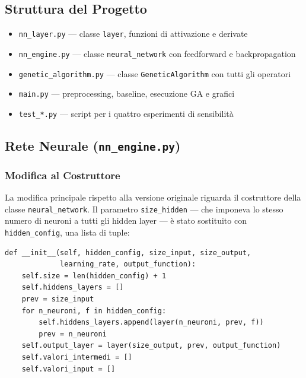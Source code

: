 \documentclass[12pt, a4paper]{article}
\begin{document}
\subsection{Struttura del Progetto}

\begin{itemize}
    \item \texttt{nn\_layer.py} --- classe \texttt{layer}, funzioni di attivazione e derivate
    \item \texttt{nn\_engine.py} --- classe \texttt{neural\_network} con feedforward e backpropagation
    \item \texttt{genetic\_algorithm.py} --- classe \texttt{GeneticAlgorithm} con tutti gli operatori
    \item \texttt{main.py} --- preprocessing, baseline, esecuzione GA e grafici
    \item \texttt{test\_*.py} --- script per i quattro esperimenti di sensibilità
\end{itemize}

\subsection{Rete Neurale (\texttt{nn\_engine.py})}

\subsubsection{Modifica al Costruttore}

La modifica principale rispetto alla versione originale riguarda il costruttore
della classe \texttt{neural\_network}. Il parametro \texttt{size\_hidden}
--- che imponeva lo stesso numero di neuroni a tutti gli hidden layer ---
è stato sostituito con \texttt{hidden\_config}, una lista di tuple:

\begin{lstlisting}[caption={Nuovo costruttore della rete neurale}]
def __init__(self, hidden_config, size_input, size_output,
             learning_rate, output_function):
    self.size = len(hidden_config) + 1
    self.hiddens_layers = []
    prev = size_input
    for n_neuroni, f in hidden_config:
        self.hiddens_layers.append(layer(n_neuroni, prev, f))
        prev = n_neuroni
    self.output_layer = layer(size_output, prev, output_function)
    self.valori_intermedi = []
    self.valori_input = []
\end{lstlisting}
\end{document}
